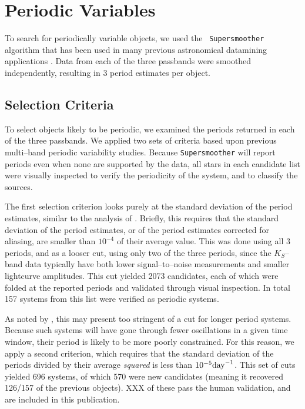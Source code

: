 \documentclass[]{emulateapj}
\begin{document}
\section{Periodic Variables}

To search for periodically variable objects, we used the {\tt
  Supersmoother} algorithm that has been used in many previous
astronomical datamining applications
\citep[e.g.][]{2011ApJ...731...17B}.  Data from each of the three
passbands were smoothed independently, resulting in 3 period estimates
per object.


\subsection{Selection Criteria}
To select objects likely to be periodic, we examined the periods
returned in each of the three passbands.  We applied two sets of
criteria based upon previous multi--band periodic variability
studies.  Because {\tt Supersmoother} will report periods even when
none are supported by the data, all stars in each candidate list were
visually inspected to verify the periodicity of the system, and to
classify the sources.

The first selection criterion looks purely at the standard deviation
of the period estimates, similar to the analysis of
\cite{2011ApJ...731...17B}.  Briefly, this requires that the standard
deviation of the period estimates, or of the period estimates
corrected for aliasing, are smaller than $10^{-4}$ of their average
value. This was done using all 3 periods, and as a looser cut, using
only two of the three periods, since the $K_S$--band data typically
have both lower signal--to--noise measurements and smaller lightcurve
amplitudes.  This cut yielded 2073 candidates, each of which were
folded at the reported periods and validated through visual
inspection.  In total 157 systems from this list were verified as
periodic systems.

As noted by \cite{2012AJ....144....9O}, this may present too stringent
of a cut for longer period systems.  Because such systems will have
gone through fewer oscillations in a given time window, their period
is likely to be more poorly constrained.  For this reason, we apply a
second criterion, which requires that the standard deviation of the
periods divided by their average {\it squared} is less than $10^{-5}
{\rm day}^{-1}$.  This set of cuts yielded 696 systems, of which 570
were new candidates (meaning it recovered 126/157 of the previous
objects).  XXX of these pass the human validation, and are included in
this publication.
\end{document}
